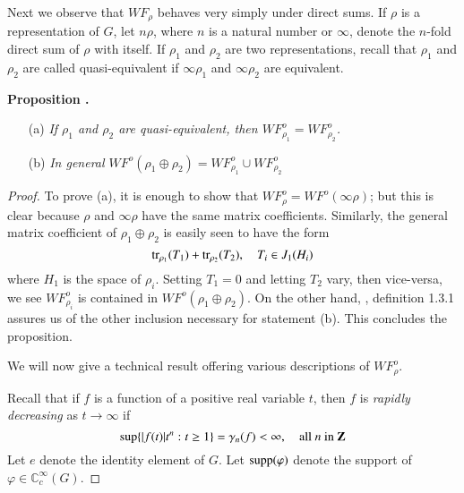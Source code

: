 Next we observe that $WF_{\rho}$ behaves very simply under direct sums. If $\rho$ is a representation of $G$, let $n\rho$, where $n$ is a natural number or $\infty$, denote the $n$-fold direct sum of $\rho$ with itself. If $\rho_{1}$ and $\rho_{2}$ are two representations, recall that $\rho_{1}$ and $\rho_{2}$ are called quasi-equivalent if $\infty \rho_{1}$ and $\infty \rho_{2}$ are equivalent.

\eject

\noindent
{\bf Proposition .\label{art3-prop1.3}}
\begin{itemize}
\item[(a)] {\em If $\rho_{1}$ and $\rho_{2}$ are quasi-equivalent, then $WF^{o}_{\rho_{1}}=WF^{o}_{\rho_{2}}$.}

\item[(b)] {\em In general $WF^{o}(\rho_{1}\oplus \rho_{2})=WF^{o}_{\rho_{1}}\cup WF^{o}_{\rho_{2}}$}
\end{itemize}

\begin{proof}
To prove (a), it is enough to show that $WF^{o}_{\rho}=WF^{o}(\infty\rho)$; but this is clear because $\rho$ and $\infty \rho$ have the same matrix coefficients. Similarly, the general matrix coefficient of $\rho_{1}\oplus \rho_{2}$ is easily seen to have the form
$$
\operatorname{tr}_{\rho_{1}}(T_{1})+\operatorname{tr}_{\rho_{2}}(T_{2}),\quad T_{i}\in J_{1}(H_{i})
$$
where $H_{1}$ is the space of $\rho_{i}$. Setting $T_{1}=0$ and letting $T_{2}$ vary, then vice-versa, we see $WF^{o}_{\rho_{i}}$ is contained in $WF^{o}(\rho_{1}\oplus \rho_{2})$. On the other hand, \cite{art3-D}, definition 1.3.1 assures us of the other inclusion necessary for statement (b). This concludes the proposition.

We will now give a technical result offering various descriptions of $WF^{o}_{\rho}$.

Recall that if $f$ is a function of a positive real variable $t$, then $f$ is {\em rapidly decreasing} as $t\to \infty$ if
\begin{equation*}
\sup \{|f(t)|t^{n}:t\geq 1\}=\gamma_{n}(f)<\infty,\quad\text{all $n$ in $\mathbf{Z}$}
\end{equation*}
Let $e$ denote the identity element of $G$. Let $\operatorname{supp}(\varphi)$ denote the support of $\varphi\in \mathbb{C}^{\infty}_{c}(G)$.
\end{proof}

